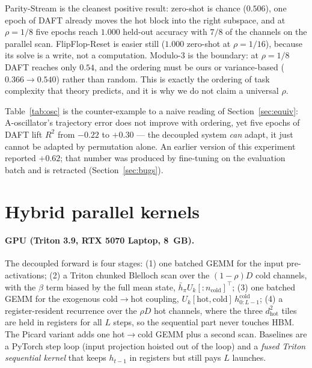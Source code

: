 \documentclass[11pt]{article}
\theoremstyle{definition}
\begin{document}
Parity-Stream is the cleanest positive result: zero-shot is chance ($0.506$), one epoch of DAFT already moves
the hot block into the right subspace, and at $\rho=1/8$ five epochs reach $1.000$ held-out accuracy with
$7/8$ of the channels on the parallel scan. FlipFlop-Reset is easier still ($1.000$ zero-shot at $\rho=1/16$),
because its solve is a write, not a computation. Modulo-3 is the boundary: at $\rho=1/8$ DAFT reaches only
$0.54$, and the ordering must be ours or variance-based ($0.366\to0.540$) rather than random. This is exactly
the ordering of task complexity that theory predicts, and it is why we do not claim a universal $\rho$.

\begin{table}[tbp]
\centering
\caption{A-oscillator recovery under DAFT (fine-tuned on \emph{fresh} sequences, evaluated on the held-out
batch).}
\label{tab:osc}


\end{table}

Table~\ref{tab:osc} is the counter-example to a naive reading of Section~\ref{sec:equiv}: A-oscillator's
trajectory error does not improve with ordering, yet five epochs of DAFT lift $R^2$ from $-0.22$ to
$+0.30$ --- the decoupled system \emph{can} adapt, it just cannot be adapted by permutation alone. An earlier
version of this experiment reported $+0.62$; that number was produced by fine-tuning on the evaluation batch
and is retracted (Section~\ref{sec:bugs}).

\section{Hybrid parallel kernels}\label{sec:kernels}

\paragraph{GPU (Triton 3.9, RTX 5070 Laptop, 8~GB).} The decoupled forward is four stages: (1) one batched GEMM
for the input pre-activations; (2) a Triton chunked Blelloch scan over the $(1-\rho)D$ cold channels, with the
$\beta$ term biased by the full mean state, $\bar h_\pi U_{k}[:n_{\text{cold}}]^\top$; (3) one batched GEMM for
the exogenous cold$\to$hot coupling, $U_{k}[\text{hot},\text{cold}]\,h^{\text{cold}}_{0:L-1}$; (4) a
register-resident recurrence over the $\rho D$ hot channels, where the three $d_{\text{hot}}^2$ tiles are held
in registers for all $L$ steps, so the sequential part never touches HBM. The Picard variant adds one hot$\to$cold
GEMM plus a second scan. Baselines are a PyTorch step loop (input projection hoisted out of the loop) and a
\emph{fused Triton sequential kernel} that keeps $h_{t-1}$ in registers but still pays $L$ launches.
\end{document}
